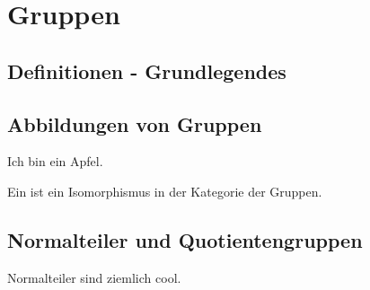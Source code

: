 \documentclass[11pt,twoside]{memoir}
\begin{document}
	
\frontmatter
\maketitle
\tableofcontents

\mainmatter
\chapter{Gruppen}

\section{Definitionen - Grundlegendes}
\lipsum[1-5]
\section{Abbildungen von Gruppen}
\lipsum[1]
\begin{lem}\label{thm:Apfel}
	Ich bin ein Apfel.
\end{lem}
\lec

\begin{defn}
	Ein  ist ein Isomorphismus in der Kategorie der Gruppen. 
\end{defn}
\newpage
\section{Normalteiler und Quotientengruppen}
\begin{prop}
	Normalteiler sind ziemlich cool.
\end{prop}
\lec
\backmatter
\printindex
\end{document}
